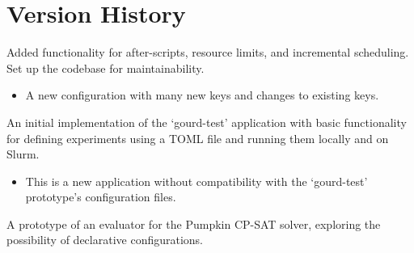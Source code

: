 \pagebreak

\section{Version History}




Added functionality for after-scripts, resource limits,
and incremental scheduling. Set up the codebase for
maintainability.

\breakingchanges
\begin{itemize}
\item A new configuration with many new keys and
changes to existing keys.
\end{itemize}


An initial implementation of the `gourd-test' application
with basic functionality for defining experiments using a
TOML file and running them locally and on Slurm.

\breakingchanges
\begin{itemize}
\item This is a new application without compatibility with
the `gourd-test' prototype's configuration files.
\end{itemize}


A prototype of an evaluator for the Pumpkin CP-SAT solver,
exploring the possibility of declarative configurations.
